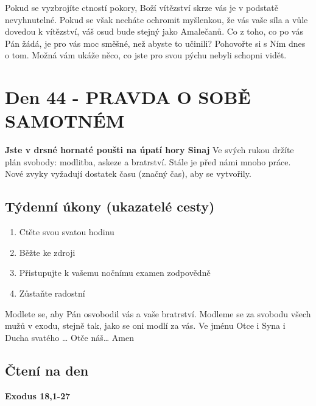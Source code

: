 \documentclass[11pt]{article}
\newcommand{\zacatekSedmyTyden}{
  \textbf{Jste v drsné hornaté poušti na úpatí hory Sinaj} \newline 
  Ve svých rukou držíte plán svobody: modlitba, askeze a bratrství. Stále je před námi mnoho práce. Nové zvyky vyžadují dostatek času (značný čas), aby se vytvořily.

  \subsection*{Týdenní úkony (ukazatelé cesty)}
\begin{enumerate}
  \item Ctěte svou svatou hodinu
  \item Běžte ke zdroji
  \item Přistupujte k vašemu nočnímu examen zodpovědně
  \item Zůstaňte radostní
\end{enumerate}
Modlete se, aby Pán osvobodil vás a vaše bratrství. \newline
Modleme se za svobodu všech mužů v exodu, stejně tak, jako se oni modlí za vás.\newline
Ve jménu Otce i Syna i Ducha svatého …  Otče náš… Amen
}
\begin{document}
Pokud se vyzbrojíte ctností pokory, Boží vítězství skrze vás je v podstatě nevyhnutelné. Pokud se však necháte
ochromit myšlenkou, že vás vaše síla a vůle dovedou k vítězství, váš osud bude stejný jako Amalečanů. Co
z toho, co po vás Pán žádá, je pro vás moc směšné, než abyste to učinili? Pohovořte si s Ním dnes o tom.
Možná vám ukáže něco, co jste pro svou pýchu nebyli schopni vidět.


\newpage
\section{Den 44 - PRAVDA O SOBĚ SAMOTNÉM }
\zacatekSedmyTyden
\subsection*{Čtení na den}
\textbf{Exodus 18,1-27}
\newline
\end{document}
